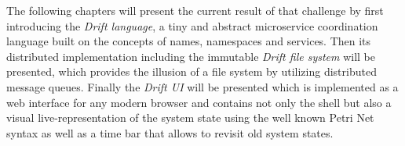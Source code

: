 The following chapters will present the current result of that challenge
by first introducing the \textit{Drift language}, a tiny and abstract
microservice coordination language built on the concepts of names,
namespaces and services. Then its distributed implementation including
the immutable \textit{Drift file system} will be presented, which
provides the illusion of a file system by utilizing distributed
message queues. Finally the \textit{Drift UI} will be presented
which is implemented as a web interface for any modern browser
and contains not only the shell but also a visual live-representation
of the system state using the well known Petri Net syntax as well as
a time bar that allows to revisit old system states.


